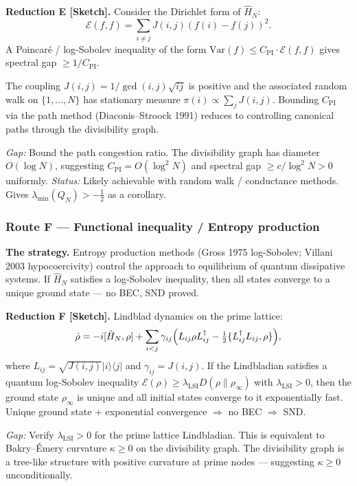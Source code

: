 \documentclass[12pt]{article}
\newcommand{\ket}[1]{|{#1}\rangle}
\newcommand{\bra}[1]{\langle{#1}|}
\newcommand{\half}{\tfrac{1}{2}}
\begin{document}
\begin{tcolorbox}[keybox]
\textbf{Reduction E [Sketch].}
Consider the Dirichlet form of $\hat{H}_N$:
\[
  \mathcal{E}(f,f) = \sum_{i \ne j} J(i,j)(f(i)-f(j))^2.
\]
A Poincar\'{e} / log-Sobolev inequality of the form
$\mathrm{Var}(f) \le C_{\mathrm{PI}} \cdot \mathcal{E}(f,f)$
gives spectral gap $\ge 1/C_{\mathrm{PI}}$.

The coupling $J(i,j) = 1/\gcd(i,j)\sqrt{ij}$ is positive and
the associated random walk on $\{1,\ldots,N\}$ has stationary measure
$\pi(i) \propto \sum_j J(i,j)$.
Bounding $C_{\mathrm{PI}}$ via the path method (Diaconis--Stroock 1991)
reduces to controlling canonical paths through the divisibility graph.
\medskip

\textit{Gap:} Bound the path congestion ratio.
The divisibility graph has diameter $O(\log N)$,
suggesting $C_{\mathrm{PI}} = O(\log^2 N)$ and
spectral gap $\ge c/\log^2 N > 0$ uniformly.
\textit{Status:} Likely achievable with random walk / conductance methods.
Gives $\lambda_{\min}(Q_N) > -\half$ as a corollary.
\end{tcolorbox}

\subsubsection*{Route F \;---\; Functional inequality / Entropy production}

\textbf{The strategy.}
Entropy production methods (Gross 1975 log-Sobolev; Villani 2003 hypocoercivity)
control the approach to equilibrium of quantum dissipative systems.
If $\hat{H}_N$ satisfies a log-Sobolev inequality, then all states
converge to a unique ground state --- no BEC, SND proved.

\begin{tcolorbox}[keybox]
\textbf{Reduction F [Sketch].}
Lindblad dynamics on the prime lattice:
\[
  \dot{\rho} = -i[\hat{H}_N, \rho]
  + \sum_{i<j} \gamma_{ij}\Bigl(L_{ij}\rho L_{ij}^\dagger
    - \tfrac{1}{2}\{L_{ij}^\dagger L_{ij}, \rho\}\Bigr),
\]
where $L_{ij} = \sqrt{J(i,j)}\ket{i}\bra{j}$ and $\gamma_{ij} = J(i,j)$.
If the Lindbladian satisfies a quantum log-Sobolev inequality
$\mathcal{E}(\rho) \ge \lambda_{\mathrm{LSI}} D(\rho\|\rho_\infty)$
with $\lambda_{\mathrm{LSI}} > 0$,
then the ground state $\rho_\infty$ is unique and all initial states
converge to it exponentially fast.
Unique ground state + exponential convergence $\Rightarrow$ no BEC $\Rightarrow$ SND.
\medskip

\textit{Gap:} Verify $\lambda_{\mathrm{LSI}} > 0$ for the prime lattice Lindbladian.
This is equivalent to Bakry--\'Emery curvature $\kappa \ge 0$ on the
divisibility graph.
The divisibility graph is a tree-like structure with positive curvature
at prime nodes --- suggesting $\kappa \ge 0$ unconditionally.
\end{tcolorbox}
\end{document}
